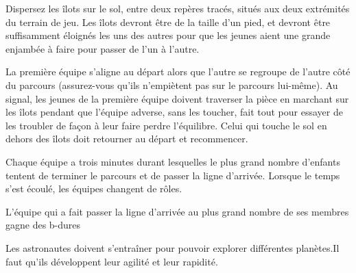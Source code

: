 \documentclass{grand-jeu}
\begin{document}
\begin{liste-materiel}
\end{liste-materiel}

\begin{regles}
Dispersez les îlots sur le sol, entre deux repères tracés, situés aux deux extrémités du terrain de jeu. Les îlots devront être de la taille d'un pied, et devront être suffisamment éloignés les uns des autres pour que les jeunes aient une grande enjambée à faire pour passer de l'un à l'autre.

La première équipe s'aligne au départ alors que l'autre se regroupe de l'autre côté du parcours (assurez-vous qu'ils n'empiètent pas sur le parcours lui-même). 
Au signal, les jeunes de la première équipe doivent traverser la pièce en marchant sur les îlots pendant que l'équipe adverse, sans les toucher, fait tout pour essayer de les troubler de façon à leur faire perdre l'équilibre. Celui qui touche le sol en dehors des îlots doit retourner au départ et recommencer. 

Chaque équipe a trois minutes durant lesquelles le plus grand nombre d'enfants tentent de terminer le parcours et de passer la ligne d'arrivée. Lorsque le temps s'est écoulé, les équipes changent de rôles.

L'équipe qui a fait passer la ligne d'arrivée au plus grand nombre de ses membres gagne des b-dures
\end{regles}

\begin{imaginaire}
Les astronautes doivent s'entraîner pour pouvoir explorer différentes planètes.Il faut qu'ils développent leur agilité et leur rapidité. 
\end{imaginaire}

\begin{moments-stop}
\end{moments-stop}
\end{document}
